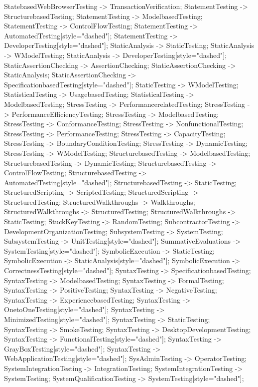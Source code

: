 \documentclass{article}
\begin{document}
{StatebasedWebBrowserTesting -> TransactionVerification;
StatementTesting -> StructurebasedTesting;
StatementTesting -> ModelbasedTesting;
StatementTesting -> ControlFlowTesting;
StatementTesting -> AutomatedTesting[style="dashed"];
StatementTesting -> DeveloperTesting[style="dashed"];
StaticAnalysis -> StaticTesting;
StaticAnalysis -> WModelTesting;
StaticAnalysis -> DeveloperTesting[style="dashed"];
StaticAssertionChecking -> AssertionChecking;
StaticAssertionChecking -> StaticAnalysis;
StaticAssertionChecking -> SpecificationbasedTesting[style="dashed"];
StaticTesting -> WModelTesting;
StatisticalTesting -> UsagebasedTesting;
StatisticalTesting -> ModelbasedTesting;
StressTesting -> PerformancerelatedTesting;
StressTesting -> PerformanceEfficiencyTesting;
StressTesting -> ModelbasedTesting;
StressTesting -> ConformanceTesting;
StressTesting -> NonfunctionalTesting;
StressTesting -> PerformanceTesting;
StressTesting -> CapacityTesting;
StressTesting -> BoundaryConditionTesting;
StressTesting -> DynamicTesting;
StressTesting -> WModelTesting;
StructurebasedTesting -> ModelbasedTesting;
StructurebasedTesting -> DynamicTesting;
StructurebasedTesting -> ControlFlowTesting;
StructurebasedTesting -> AutomatedTesting[style="dashed"];
StructurebasedTesting -> StaticTesting;
StructuredScripting -> ScriptedTesting;
StructuredScripting -> StructuredTesting;
StructuredWalkthroughs -> Walkthroughs;
StructuredWalkthroughs -> StructuredTesting;
StructuredWalkthroughs -> StaticTesting;
StuckKeyTesting -> RandomTesting;
SubcontractorTesting -> DevelopmentOrganizationTesting;
SubsystemTesting -> SystemTesting;
SubsystemTesting -> UnitTesting[style="dashed"];
SummativeEvaluations -> SystemTesting[style="dashed"];
SymbolicExecution -> StaticTesting;
SymbolicExecution -> StaticAnalysis[style="dashed"];
SymbolicExecution -> CorrectnessTesting[style="dashed"];
SyntaxTesting -> SpecificationbasedTesting;
SyntaxTesting -> ModelbasedTesting;
SyntaxTesting -> FormalTesting;
SyntaxTesting -> PositiveTesting;
SyntaxTesting -> NegativeTesting;
SyntaxTesting -> ExperiencebasedTesting;
SyntaxTesting -> OnetoOneTesting[style="dashed"];
SyntaxTesting -> MinimizedTesting[style="dashed"];
SyntaxTesting -> StaticTesting;
SyntaxTesting -> SmokeTesting;
SyntaxTesting -> DesktopDevelopmentTesting;
SyntaxTesting -> FunctionalTesting[style="dashed"];
SyntaxTesting -> GrayBoxTesting[style="dashed"];
SyntaxTesting -> WebApplicationTesting[style="dashed"];
SysAdminTesting -> OperatorTesting;
SystemIntegrationTesting -> IntegrationTesting;
SystemIntegrationTesting -> SystemTesting;
SystemQualificationTesting -> SystemTesting[style="dashed"];
}
\end{document}
